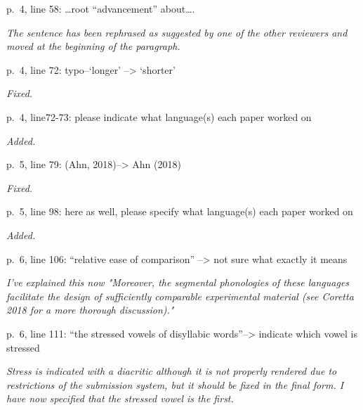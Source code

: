 \documentclass[]{article}
\begin{document}
p.~4, line 58: \ldots{}root ``advancement'' about\ldots{}.

\begin{adjustwidth}{1cm}{} \textit{
The sentence has been rephrased as suggested by one of the other reviewers and moved at the beginning of the paragraph.
} \end{adjustwidth}

p.~4, line 72: typo--`longer' --\textgreater{} `shorter'

\begin{adjustwidth}{1cm}{} \textit{
Fixed.
} \end{adjustwidth}

p.~4, line72-73: please indicate what language(s) each paper worked on

\begin{adjustwidth}{1cm}{} \textit{
Added.
} \end{adjustwidth}

p.~5, line 79: (Ahn, 2018)--\textgreater{} Ahn (2018)

\begin{adjustwidth}{1cm}{} \textit{
Fixed.
} \end{adjustwidth}

p.~5, line 98: here as well, please specify what language(s) each paper
worked on

\begin{adjustwidth}{1cm}{} \textit{
Added.
} \end{adjustwidth}

p.~6, line 106: ``relative ease of comparison'' --\textgreater{} not
sure what exactly it means

\begin{adjustwidth}{1cm}{} \textit{
I've explained this now "Moreover, the segmental phonologies of these languages facilitate the design of sufficiently comparable experimental material (see Coretta 2018 for a more thorough discussion)."
} \end{adjustwidth}

p.~6, line 111: ``the stressed vowels of disyllabic
words''--\textgreater{} indicate which vowel is stressed

\begin{adjustwidth}{1cm}{} \textit{
Stress is indicated with a diacritic although it is not properly rendered due to restrictions of the submission system, but it should be fixed in the final form. I have now specified that the stressed vowel is the first.
} \end{adjustwidth}
\end{document}
